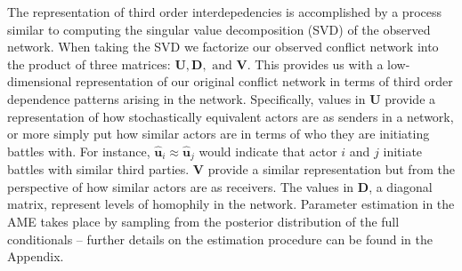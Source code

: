 The representation of third order interdepedencies is accomplished by a process similar to computing the singular value decomposition (SVD) of the observed network. When taking the SVD we factorize our observed conflict network into the product of three matrices: $\textbf{U}, \textbf{D}, \text{ and } \textbf{V}$. This provides us with a low-dimensional representation of our original conflict network in terms of third order dependence patterns arising in the network. Specifically, values in $\textbf{U}$ provide a representation of how stochastically equivalent actors are as senders in a network, or more simply put how similar actors are in terms of who they are initiating battles with. For instance, $\hat{\textbf{u}}_{i} \approx \hat{\textbf{u}}_{j}$ would indicate that actor $i$ and $j$ initiate battles with similar third parties. $\textbf{V}$ provide a similar representation but from the perspective of how similar actors are as receivers. The values in $\textbf{D}$, a diagonal matrix, represent levels of homophily in the network. Parameter estimation in the AME takes place by sampling from the posterior distribution of the full conditionals -- further details on the estimation procedure can be found in the Appendix.
